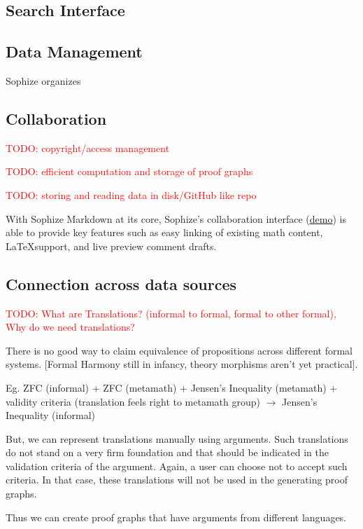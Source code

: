 \documentclass[a4paper]{article}
\newcommand\todo[1]{\textcolor{red}{TODO: #1}}
\begin{document}
\subsection{Search Interface}


\subsection{Data Management}
Sophize organizes 


\subsection{Collaboration}





\todo{copyright/access management}

\todo{efficient computation and storage of proof graphs}

\todo{ storing and reading data in disk/GitHub like repo }

With Sophize Markdown at its core, Sophize's collaboration interface\cite{todo}  (\underline{\href{https://youtu.be/d3gaalJ7UQM}{demo}}) is able to provide key features such as easy linking of existing math content, \LaTeX\space support, and live preview comment drafts.


\subsection{Connection across data sources}
\todo{What are Translations? (informal to formal, formal to other formal), Why do we need translations?}

There is no good way to claim equivalence of propositions across different formal systems. [Formal Harmony still in infancy, theory morphisms aren't yet practical].


Eg. ZFC (informal) + ZFC (metamath) + Jensen's Inequality (metamath) + validity criteria (translation feels right to metamath group) $\rightarrow$ 
Jensen's Inequality (informal)

But, we can represent translations manually using arguments. Such translations do not stand on a very firm foundation and that should be indicated in the validation criteria of the argument. Again, a user can choose not to accept such criteria. In that case, these translations will not be used in the generating proof graphs.


Thus we can create proof graphs that have arguments from different languages.
\end{document}
